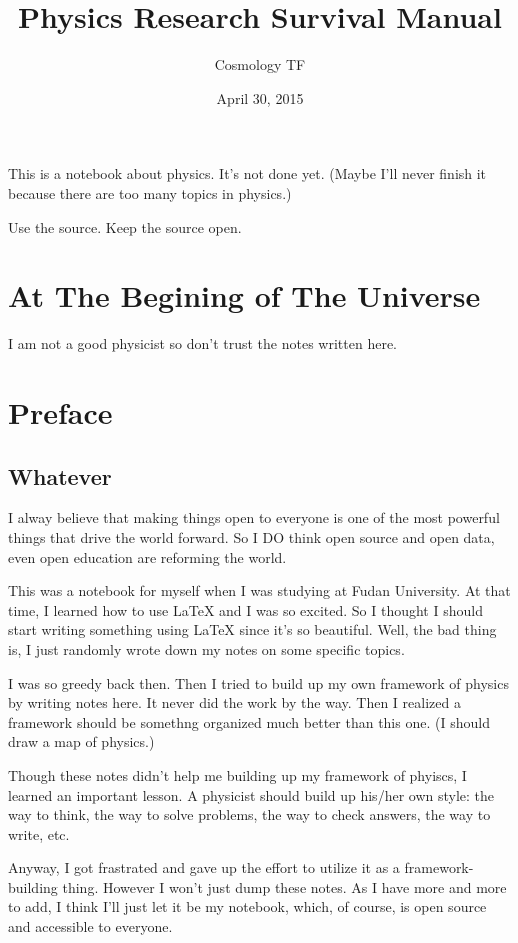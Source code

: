 \documentclass[letterpaper,10pt,english]{sphinxmanual}
\title{Physics Research Survival Manual}
\date{April 30, 2015}
\author{Cosmology TF}
\begin{document}
\maketitle
\tableofcontents
{}\label{index::doc}


This is a notebook about physics. It's not done yet. (Maybe I'll never finish it because there are too many topics in physics.)

Use the source. Keep the source open.


\chapter{At The Begining of The Universe}
\label{index:at-the-begining-of-the-universe}\label{index:welcome-to-physics-research-survival-manual}
I am not a good physicist so don't trust the notes written here.


\chapter{Preface}
\label{index:preface}

\section{Whatever}
\label{preface::doc}\label{preface:whatever}
I alway believe that making things open to everyone is one of the most powerful things that drive the world forward. So I DO think open source and open data, even open education are reforming the world.

This was a notebook for myself when I was studying at Fudan University. At that time, I learned how to use LaTeX and I was so excited. So I thought I should start writing something using LaTeX since it's so beautiful. Well, the bad thing is, I just randomly wrote down my notes on some specific topics.

I was so greedy back then. Then I tried to build up my own framework of physics by writing notes here. It never did the work by the way. Then I realized a framework should be somethng organized much better than this one. (I should draw a map of physics.)

Though these notes didn't help me building up my framework of phyiscs, I learned an important lesson. A physicist should build up his/her own style: the way to think, the way to solve problems, the way to check answers, the way to write, etc.

Anyway, I got frastrated and gave up the effort to utilize it as a framework-building thing. However I won't just dump these notes. As I have more and more to add, I think I'll just let it be my notebook, which, of course, is open source and accessible to everyone.
\end{document}
